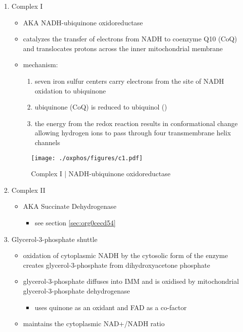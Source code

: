 \documentclass{scrartcl}
\begin{document}
\begin{enumerate}
\item Complex I
\label{sec:orgd72d561}
\begin{itemize}
\item AKA NADH-ubiquinone oxidoreductase
\item catalyzes the transfer of electrons from NADH to coenzyme Q10
(CoQ) and translocates protons across the inner mitochondrial
membrane
\end{itemize}

{\small{}}

\begin{itemize}
\item mechanism: 
\begin{enumerate}
\item seven iron sulfur centers carry electrons from the site of NADH
oxidation to ubiquinone

\item ubiquinone (CoQ) is reduced to ubiquinol ()

\item the energy from the redox reaction results in conformational
change allowing hydrogen ions to pass through four transmembrane
helix channels
\end{enumerate}
\end{itemize}

\begin{figure}[htbp]
\centering
\texttt{[image: ./oxphos/figures/c1.pdf]}
\caption[c1]{\label{fig:org9ffc6f4}
Complex I | NADH-ubiquinone oxidoreductase}
\end{figure}

\item Complex II
\label{sec:org2bd1566}
\begin{itemize}
\item AKA Succinate Dehydrogenase 
\begin{itemize}
\item see section \ref{sec:org0cecd54}
\end{itemize}
\end{itemize}

\item Glycerol-3-phosphate shuttle
\label{sec:org1d6016d}
\begin{itemize}
\item oxidation of cytoplasmic NADH by the cytosolic form of the enzyme
creates glycerol-3-phosphate from dihydroxyacetone phosphate
\item glycerol-3-phosphate diffuses into IMM and is oxidised by mitochondrial glycerol-3-phosphate dehydrogenase
\begin{itemize}
\item uses quinone as an oxidant and FAD as a co-factor
\end{itemize}
\item maintains the cytoplasmic NAD+/NADH ratio
\end{itemize}


\end{enumerate}
\end{document}
